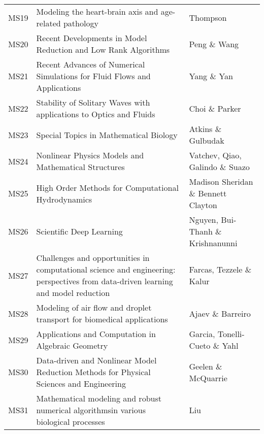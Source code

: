 \begin{center}
\begin{footnotesize}
\begin{tabular}{p{0.8cm} p{9cm} p{6cm}}
\rowcolor{black!10}
MS19 & Modeling the heart-brain axis and age-related pathology & Thompson\\
MS20 & Recent Developments in Model Reduction and Low Rank Algorithms & Peng \& Wang\\
\rowcolor{black!10}
MS21 & Recent Advances of Numerical Simulations for Fluid Flows and Applications & Yang \& Yan\\
MS22 & Stability of Solitary Waves with applications to Optics and Fluids & Choi \& Parker\\
\rowcolor{black!10}
MS23 & Special Topics in Mathematical Biology & Atkins \& Gulbudak\\
MS24 & Nonlinear Physics Models and Mathematical Structures & Vatchev, Qiao, Galindo \& Suazo\\
\rowcolor{black!10}
MS25 & High Order Methods for Computational Hydrodynamics & Madison Sheridan \& Bennett Clayton\\
MS26 & Scientific Deep Learning & Nguyen, Bui-Thanh \& Krishnanunni\\
\rowcolor{black!10}
MS27 & Challenges and opportunities in computational science and engineering: perspectives from data-driven learning and model reduction & Farcas, Tezzele \& Kalur\\
MS28 & Modeling of air flow and droplet transport for biomedical applications & Ajaev \& Barreiro\\
\rowcolor{black!10}
MS29 & Applications and Computation in Algebraic Geometry & Garcia, Tonelli-Cueto \& Yahl\\
MS30 & Data-driven and Nonlinear Model Reduction Methods for Physical Sciences and Engineering & Geelen \& McQuarrie\\
\rowcolor{black!10} MS31 & Mathematical modeling and robust numerical algorithmsin various biological processes & Liu\\
\bottomrule
\end{tabular}
\end{footnotesize}
\end{center}
